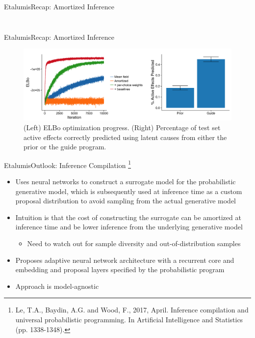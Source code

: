 \documentclass[AERbeamer%
              ,optEnglish%
              ,optBiber%
              ,optBibstyleAlphabetic%
              ,optBeamerClassicFormat%
              ]{AERlatex}%
\begin{document}
\begin{frame}[c]{Etalumis}{Recap: Amortized Inference}
\begin{columns}[T]
\begin{column}{0.58\textwidth}
\begin{figure}
            \end{figure}
        \end{column}
    \end{columns}
\end{frame}


\begin{frame}[c]{Etalumis}{Recap: Amortized Inference}
    \centering
    \begin{figure}
        \centering
        \includegraphics[width=\textwidth]{AmortizedInferenceQMR-DTPerformance.png}
        \caption{(Left) ELBo optimization progress. (Right) Percentage of test set active effects
                 correctly predicted using latent causes from either the prior or the guide program.}
    \end{figure}
\end{frame}


\begin{frame}[c]{Etalumis}{Outlook: Inference Compilation \footnote{Le, T.A., Baydin, A.G. and Wood, F., 2017, April. Inference
                                                                    compilation and universal probabilistic programming. In Artificial
                                                                    Intelligence and Statistics (pp. 1338-1348).}    }
    \centering
    \begin{itemize}
        \item Uses neural networks to construct a surrogate model for the probabilistic generative model, which is subsequently
              used at inference time as a custom proposal distribution to avoid sampling from the actual generative model
        \item Intuition is that the cost of constructing the surrogate can be amortized at inference time and be lower
              inference from the underlying generative model
        \begin{itemize}
            \item Need to watch out for sample diversity and out-of-distribution samples 
        \end{itemize}
        \item Proposes adaptive neural network architecture with a recurrent core and embedding and proposal layers specified
              by the probabilistic program
        \item Approach is model-agnostic
    \end{itemize}
\end{frame}
\end{document}
